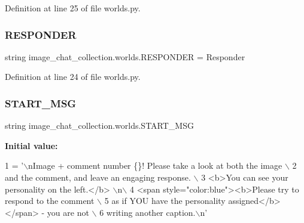 Definition at line 25 of file worlds.\+py.

\mbox{\label{namespaceimage__chat__collection_1_1worlds_a22c04cbc8759ece080253442ddbb125d}} 
\subsubsection{\texorpdfstring{R\+E\+S\+P\+O\+N\+D\+ER}{RESPONDER}}
{\footnotesize\ttfamily string image\+\_\+chat\+\_\+collection.\+worlds.\+R\+E\+S\+P\+O\+N\+D\+ER = \textquotesingle{}Responder\textquotesingle{}}



Definition at line 24 of file worlds.\+py.

\mbox{\label{namespaceimage__chat__collection_1_1worlds_a0a07648da0f4166bc06223c88e49d68e}} 
\subsubsection{\texorpdfstring{S\+T\+A\+R\+T\+\_\+\+M\+SG}{START\_MSG}}
{\footnotesize\ttfamily string image\+\_\+chat\+\_\+collection.\+worlds.\+S\+T\+A\+R\+T\+\_\+\+M\+SG}

{\bfseries Initial value\+:}
\begin{DoxyCode}
1 =  \textcolor{stringliteral}{'\(\backslash\)nImage + comment number \{\}! Please take a look at both the image \(\backslash\)}
2 \textcolor{stringliteral}{        and the comment, and leave an engaging response. \(\backslash\)}
3 \textcolor{stringliteral}{        <b>You can see your personality on the left.</b> \(\backslash\)n\(\backslash\)}
4 \textcolor{stringliteral}{        <span style="color:blue"><b>Please try to respond to the comment \(\backslash\)}
5 \textcolor{stringliteral}{        as if YOU have the personality assigned</b></span> - you are not \(\backslash\)}
6 \textcolor{stringliteral}{        writing another caption.\(\backslash\)n'}
\end{DoxyCode}


